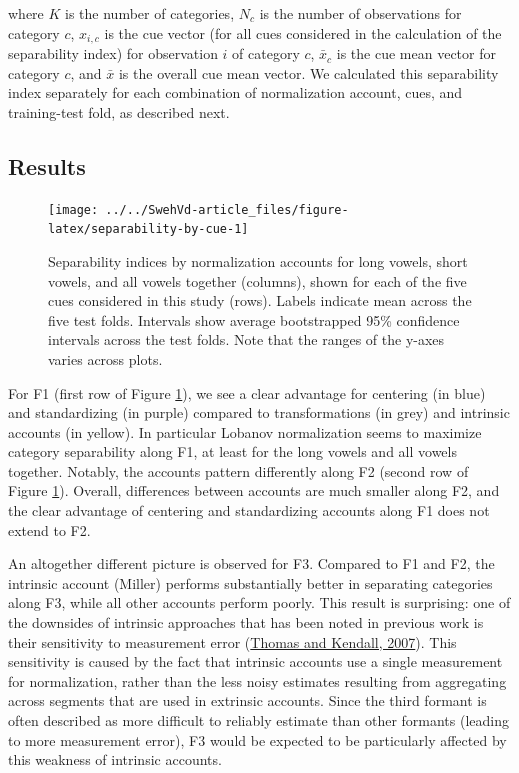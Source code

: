 \documentclass[utf8]{frontiers_suppmat} %
\begin{document}
where \(K\) is the number of categories, \(N_c\) is the number of observations for category \(c\), \(x_{i,c}\) is the cue vector (for all cues considered in the calculation of the separability index) for observation \(i\) of category \(c\), \(\bar{x}_c\) is the cue mean vector for category \(c\), and \(\bar{x}\) is the overall cue mean vector. We calculated this separability index separately for each combination of normalization account, cues, and training-test fold, as described next.

\hypertarget{sec:resultsI}{%
\subsection{Results}\label{sec:resultsI}}



\begin{figure}

{\centering \texttt{[image: ../../SwehVd-article\_files/figure-latex/separability-by-cue-1]} 

}

\caption{Separability indices by normalization accounts for long vowels, short vowels, and all vowels together (columns), shown for each of the five cues considered in this study (rows). Labels indicate mean across the five test folds. Intervals show average bootstrapped 95\% confidence intervals across the test folds. Note that the ranges of the y-axes varies across plots.}\label{fig:separability-by-cue}
\end{figure}

For F1 (first row of Figure \ref{fig:separability-by-cue}), we see a clear advantage for centering (in blue) and standardizing (in purple) compared to transformations (in grey) and intrinsic accounts (in yellow). In particular Lobanov normalization seems to maximize category separability along F1, at least for the long vowels and all vowels together. Notably, the accounts pattern differently along F2 (second row of Figure \ref{fig:separability-by-cue}). Overall, differences between accounts are much smaller along F2, and the clear advantage of centering and standardizing accounts along F1 does not extend to F2.

An altogether different picture is observed for F3. Compared to F1 and F2, the intrinsic account (Miller) performs substantially better in separating categories along F3, while all other accounts perform poorly. This result is surprising: one of the downsides of intrinsic approaches that has been noted in previous work is their sensitivity to measurement error (\protect\hyperlink{ref-thomas2007}{Thomas and Kendall, 2007}). This sensitivity is caused by the fact that intrinsic accounts use a single measurement for normalization, rather than the less noisy estimates resulting from aggregating across segments that are used in extrinsic accounts. Since the third formant is often described as more difficult to reliably estimate than other formants (leading to more measurement error), F3 would be expected to be particularly affected by this weakness of intrinsic accounts.
\end{document}
